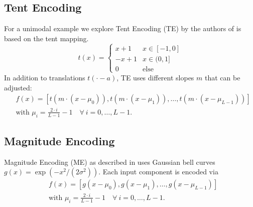 \subsection{Tent Encoding}
For a unimodal example we explore Tent Encoding (TE) by the authors of \cite{jahrens2020solving} is based on the tent mapping.
    \[t(x) = \begin{cases} x+1 & x \in [-1,0] \\ -x+1 & x \in (0,1]\\ 0 & \text{else} \end{cases}\]
In addition to translations $t(\cdot-a)$, TE uses different slopes $m$ that can be adjusted:
\begin{align*}
    &f(x) =\left[t\left(m\cdot(x-\mu_0)\right), t\left(m\cdot(x-\mu_1)\right),\ldots,t\left(m\cdot(x-\mu_{L-1})\right)\right]\\&\text{with }\mu_i=\frac{2\cdot i}{L-1}-1\quad\forall\ i=0,\ldots,L-1.
\end{align*}

\subsection{Magnitude Encoding}
Magnitude Encoding (ME) as described in \cite{jahrens2020solving} uses Gaussian bell curves $g(x)=\exp(-x^2/(2\sigma^2))$. Each input component is encoded via
\begin{align*}
    &f(x) =\left[g\left(x-\mu_0\right), g\left(x-\mu_1\right),\ldots,g\left(x-\mu_{L-1}\right)\right]\\&\text{with }\mu_i=\frac{2\cdot i}{L-1}-1\quad\forall\ i=0,\ldots,L-1.
\end{align*}